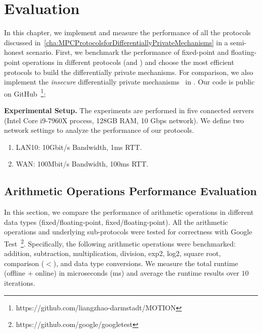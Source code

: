 \chapter{Evaluation}
\label{cha:evaluation}



In this chapter, we implement and measure the performance of all the protocols discussed in~\autoref{cha:MPCProtocolsforDifferentiallyPrivateMechanisms} in a semi-honest scenario.
First, we benchmark the performance of fixed-point and floating-point operations in different \smpc protocols (\booleanGMW and \arithmeticGMW) and choose the most efficient \smpc protocols to build the differentially private mechanisms. For comparison, we also implement the \textit{insecure} differentially private mechanisms~\cite{eigner2014differentially} in \smpc.
Our code is public on GitHub~\footnote{https://github.com/liangzhao-darmstadt/MOTION};



\textbf{Experimental Setup.}
The experiments are performed in five connected servers (Intel Core i9-7960X process, 128GB RAM, 10 Gbps network). We define two network settings to analyze the performance of our \smpc protocols.
\begin{enumerate}
    \item LAN10: 10Gbit/s Bandwidth, 1ms RTT.
    \item WAN: 100Mbit/s Bandwidth, 100ms RTT.
\end{enumerate}

\section{Arithmetic Operations Performance Evaluation}
\label{sec:ArithmeticOperationsPerformanceEvaluation}
In this section, we compare the performance of arithmetic operations in different data types (\booleanGMW fixed/floating-point, \arithmeticGMW fixed/floating-point).
All the arithmetic operations and underlying sub-protocols were tested for correctness with Google Test~\footnote{https://github.com/google/googletest}.
Specifically, the following arithmetic operations were benchmarked: addition, subtraction, multiplication, division, exp2, log2, square root, comparison ($<$), and data type conversions.
We measure the total runtime (offline + online) in microseconds (ms) and average the runtime results over $10$ iterations.

